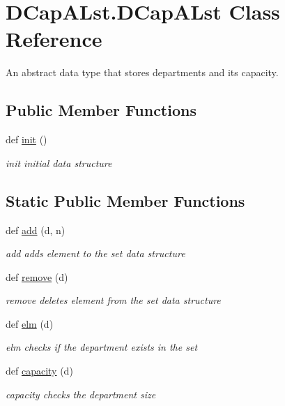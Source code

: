 \hypertarget{class_d_cap_a_lst_1_1_d_cap_a_lst}{}\section{D\+Cap\+A\+Lst.\+D\+Cap\+A\+Lst Class Reference}
\label{class_d_cap_a_lst_1_1_d_cap_a_lst}


An abstract data type that stores departments and it\textquotesingle{}s capacity.  


\subsection*{Public Member Functions}
\begin{DoxyCompactItemize}
\item 
\mbox{\label{class_d_cap_a_lst_1_1_d_cap_a_lst_aaed5d536e93c43a53eca6c75faa64d2e}} 
def \mbox{\hyperlink{class_d_cap_a_lst_1_1_d_cap_a_lst_aaed5d536e93c43a53eca6c75faa64d2e}{init}} ()
\begin{DoxyCompactList}\small\item\em init initial data structure \end{DoxyCompactList}\end{DoxyCompactItemize}
\subsection*{Static Public Member Functions}
\begin{DoxyCompactItemize}
\item 
def \mbox{\hyperlink{class_d_cap_a_lst_1_1_d_cap_a_lst_ad99d7bc7b919406b4a700f19b8cd7f14}{add}} (d, n)
\begin{DoxyCompactList}\small\item\em add adds element to the set data structure \end{DoxyCompactList}\item 
def \mbox{\hyperlink{class_d_cap_a_lst_1_1_d_cap_a_lst_a8113456541a139e9c9a59dc371e84c3f}{remove}} (d)
\begin{DoxyCompactList}\small\item\em remove deletes element from the set data structure \end{DoxyCompactList}\item 
def \mbox{\hyperlink{class_d_cap_a_lst_1_1_d_cap_a_lst_a67f399569fb01750b284689b66cf1b25}{elm}} (d)
\begin{DoxyCompactList}\small\item\em elm checks if the department exists in the set \end{DoxyCompactList}\item 
def \mbox{\hyperlink{class_d_cap_a_lst_1_1_d_cap_a_lst_a4551b60c299ae51b0fd00257a40d61db}{capacity}} (d)
\begin{DoxyCompactList}\small\item\em capacity checks the department size \end{DoxyCompactList}\end{DoxyCompactItemize}
